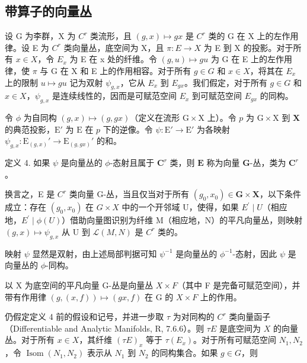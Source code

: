 \subsection{带算子的向量丛}

设 G 为李群，X 为 \(C^{r}\) 类流形，且 \((g, x) \mapsto gx\) 是 \(C^{r}\) 类的 G 在 X 上的左作用律。设 E 为 \(C^{r}\) 类向量丛，底空间为 X，且 \(\pi: E \to X\) 为 E 到 X 的投影。对于所有 \(x \in X\)，令 \(E_{x}\) 为 E 在 x 处的纤维。令 \((g, u) \mapsto gu\) 为 G 在 E 上的左作用律，使 \(\pi\) 与 G 在 X 和 E 上的作用相容。对于所有 \(g \in G\) 和 \(x \in X\)，将其在 \(E_{x}\) 上的限制 \(u \mapsto gu\) 记为双射 \(\psi_{g,x}\)，它从 \(E_{x}\) 到 \(E_{gx}\)。我们假定，对于所有 \(g \in G\) 和 \(x \in X\)，\(\psi_{g,x}\) 是连续线性的，因而是可赋范空间 \(E_{x}\) 到可赋范空间 \(E_{gx}\) 的同构。

令 \(\phi\) 为自同构 \((g,x)\mapsto (g,gx)\)（定义在流形 \(\mathrm{G}\times \mathrm{X}\) 上）。令 \(p\) 为 \(\mathrm{G}\times \mathrm{X}\) 到 \(\mathbf{X}\) 的典范投影，\(\mathrm{E}'\) 为 \(\mathrm{E}\) 在 \(p\) 下的逆像。令 \(\psi \colon \mathrm{E}'\to \mathrm{E}'\) 为各映射 \(\psi_{g,x}\colon \mathrm{E}_{(g,x)}'\to \mathrm{E}_{(g,gx)}'\) 的和。

定义 4. 如果 \(\psi\) 是向量丛的 \(\phi\)-态射且属于 \(\mathbf{C}^r\) 类，则 \(\mathbf{E}\) 称为向量 \(\mathbf{G}\)-丛，类为 \(\mathbf{C}^r\)。

换言之，E 是 \(C^{r}\) 类向量 G-丛，当且仅当对于所有 \((g_{0}, x_{0}) \in \mathbf{G} \times \mathbf{X}\)，以下条件成立：存在 \((g_{0}, x_{0})\) 在 \(G \times X\) 中的一个开邻域 U，使得，如果 \(E^{\prime} \mid U\)（相应地，\(E^{\prime} \mid \phi(U)\)）借助向量图识别为纤维 M（相应地，N）的平凡向量丛，则映射 \((g, x) \mapsto \psi_{g,x}\) 从 U 到 \(\mathcal{L}(M, N)\) 是 \(C^{r}\) 类的。

映射 \(\psi\) 显然是双射，由上述局部判据可知 \(\psi^{-1}\) 是向量丛的 \(\phi^{-1}\)-态射，因此 \(\psi\) 是向量丛的 \(\phi\)-同构。

以 X 为底空间的平凡向量 G-丛是向量丛 \(X \times F\)（其中 F 是完备可赋范空间），并带有作用律 \((g, (x, f)) \mapsto (gx, f)\) 在 G 的 \(X \times F\) 上的作用。

仍假定定义 4 前的假设和记号，并进一步取 \(\tau\) 为对同构的 \(C^r\) 类向量函子（Differentiable and Analytic Manifolds, R, 7.6.6）。则 \(\tau E\) 是底空间为 \(X\) 的向量丛。对于所有 \(x \in X\)，其纤维 \((\tau E)_x\) 等于 \(\tau (E_x)\)。对于所有可赋范空间 \(N_1, N_2\)，令 \(\operatorname{Isom}(N_1, N_2)\) 表示从 \(N_1\) 到 \(N_2\) 的同构集合。如果 \(g \in G\)，则


